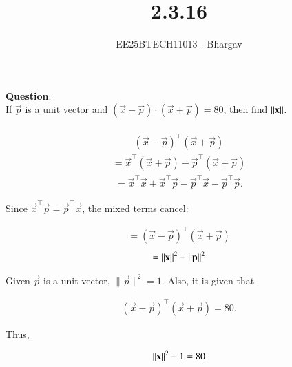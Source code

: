 \documentclass[journal]{IEEEtran}
\begin{document}

\vspace{3cm}

\title{2.3.16}
\author{EE25BTECH11013 - Bhargav}
\maketitle
{\let\newpage\relax\maketitle}

\renewcommand{\thefigure}{\theenumi}
\renewcommand{\thetable}{\theenumi}
\setlength{\intextsep}{10pt} %


\renewcommand{\thetable}{\theenumi}

\textbf{Question}:\\
If $\vec{p}$ is a unit vector and $(\vec{x}-\vec{p})\cdot(\vec{x}+\vec{p})=80$, then find $\left\lVert\mathbf{x}\right\rVert$. \\
\solution \\
\begin{align}
(\vec{x}-\vec{p})^\top (\vec{x}+\vec{p})
\end{align}
\begin{align}
= \vec{x}^\top(\vec{x}+\vec{p}) - \vec{p}^\top(\vec{x}+\vec{p})
\end{align}
\begin{align}
= \vec{x}^\top \vec{x} + \vec{x}^\top \vec{p} - \vec{p}^\top \vec{x} - \vec{p}^\top \vec{p}.
\end{align}


Since $\vec{x}^\top \vec{p} = \vec{p}^\top \vec{x}$, the mixed terms cancel:

\begin{align}
 = (\vec{x}-\vec{p})^\top (\vec{x}+\vec{p})
\end{align}
\begin{align}
= \left\lVert\mathbf{x}\right\rVert^{2} - \left\lVert\mathbf{p}\right\rVert^{2}
\end{align}

Given $\vec{p}$ is a unit vector, $\|\vec{p}\|^2 = 1$. Also, it is given that

\begin{align}
(\vec{x}-\vec{p})^\top (\vec{x}+\vec{p}) = 80.
\end{align}

Thus,

\begin{align}
\left\lVert\mathbf{x}\right\rVert^2 - 1 = 80 
\end{align}
\end{document}

